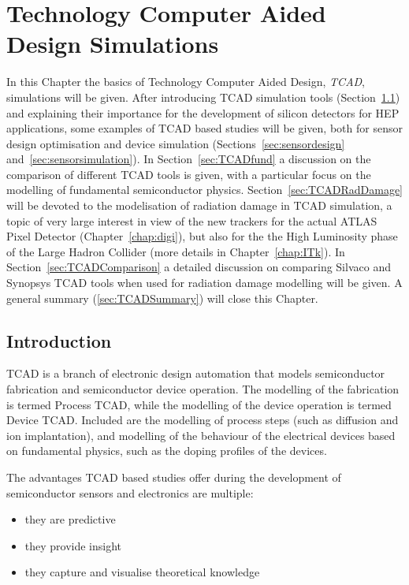 \chapter{Technology Computer Aided Design Simulations}
\label{chap:TCAD}
In this Chapter the basics of Technology Computer Aided Design, {\it TCAD}, simulations will be given. 
After introducing TCAD simulation tools (Section~\ref{sec:TCADIntro}) and explaining their importance
 for the development of silicon detectors for HEP applications, some examples of TCAD based 
 studies will be given, both for sensor design optimisation and device simulation 
 (Sections~\ref{sec:sensordesign} and~\ref{sec:sensorsimulation}). 
 In Section~\ref{sec:TCADfund} a discussion on the comparison of different TCAD tools is given, 
 with a particular focus on the modelling of fundamental semiconductor physics.
Section~\ref{sec:TCADRadDamage} will be devoted to the modelisation of radiation damage in 
TCAD simulation, a topic of very large interest in view of the new trackers for the actual ATLAS 
Pixel Detector (Chapter~\ref{chap:digi}), but also for the 
the High Luminosity phase of the Large Hadron Collider (more details in Chapter~\ref{chap:ITk}).
In Section~\ref{sec:TCADComparison} a detailed discussion on comparing Silvaco and Synopsys 
TCAD tools when used for radiation damage modelling will be given. A general summary (\ref{sec:TCADSummary}) will close this 
Chapter.


\section{Introduction}
\label{sec:TCADIntro}

 TCAD is a branch of electronic design automation that models semiconductor fabrication and 
 semiconductor device operation. 
 The modelling of the fabrication is termed Process TCAD, while the modelling of the device operation 
 is termed Device TCAD. 
Included are the modelling of process steps (such as diffusion and ion implantation), and modelling of 
the behaviour of the electrical devices based on fundamental physics, such as the doping profiles of 
the devices. 

The advantages TCAD based studies offer during the development of semiconductor sensors 
and electronics are multiple: 

\begin{itemize}
\item they are predictive
\item they provide insight
\item they capture and visualise theoretical knowledge
\end{itemize}

